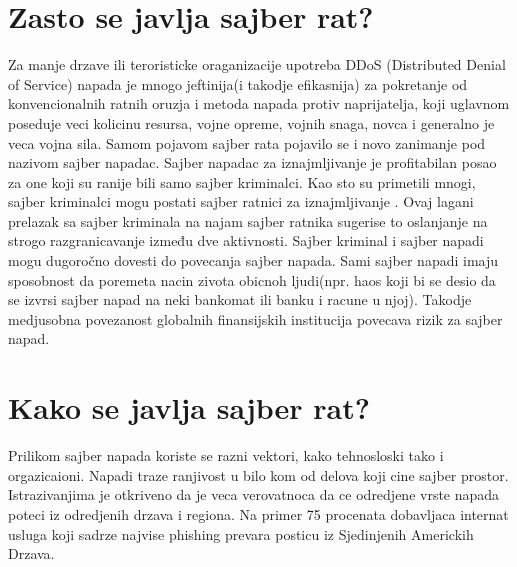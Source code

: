 \documentclass[a4paper]{article}
\begin{document}
{\newpage

 



\section{Zasto se javlja sajber rat?}
\label{slike_i_tabele}

Za manje drzave ili teroristicke oraganizacije upotreba DDoS (Distributed Denial of Service) napada je mnogo jeftinija(i takodje efikasnija) za pokretanje od konvencionalnih ratnih oruzja i metoda napada protiv naprijatelja, koji uglavnom poseduje veci kolicinu resursa, vojne opreme, vojnih snaga, novca i generalno je veca vojna sila. Samom pojavom sajber rata pojavilo se i novo zanimanje pod nazivom sajber napadac. Sajber napadac za iznajmljivanje je profitabilan posao za one koji su ranije bili samo sajber kriminalci.
Kao sto su primetili mnogi, sajber kriminalci mogu postati sajber ratnici za iznajmljivanje . 
Ovaj lagani prelazak sa sajber kriminala na najam sajber ratnika sugerise to oslanjanje na strogo razgranicavanje između dve aktivnosti.
Sajber kriminal i sajber napadi mogu dugoročno dovesti do povecanja sajber napada.
Sami sajber napadi imaju sposobnost da poremeta nacin zivota obicnoh ljudi(npr. haos koji bi se desio da se izvrsi sajber napad na neki bankomat ili banku i racune u njoj). Takodje medjusobna povezanost globalnih finansijskih institucija povecava rizik za sajber napad.







\section{Kako se javlja sajber rat?}
\label{sec:naslov1}


Prilikom sajber napada koriste se razni vektori, kako tehnosloski tako i orgazicaioni. Napadi traze ranjivost u bilo kom od delova koji cine sajber prostor. Istrazivanjima je otkriveno da je veca verovatnoca da ce odredjene vrste napada poteci iz odredjenih drzava i regiona. Na primer 75 procenata dobavljaca internat usluga koji sadrze najvise phishing prevara posticu iz Sjedinjenih Americkih Drzava.

\begin{verbatim}
\end{verbatim}

}
\end{document}

